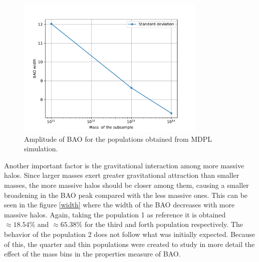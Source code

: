 \begin{figure}[htbp]
       \centering

    \includegraphics[width=90mm]{Images/chapter4/Width_vs_Mh.pdf}
\caption{\small Amplitude of BAO for the populations obtained from MDPL simulation.}
       \label{ampl}
 \end{figure}

Another important factor is the gravitational interaction among more massive halos.
Since larger masses exert greater gravitational attraction than smaller masses, 
the more massive halos should be closer among them, causing a smaller broadening
in the BAO peak compared with the less massive ones. This can be seen in the
figure \ref{width} where the width of the BAO decreases with more massive halos.
Again, taking the population 1 as reference it is obtained $\approx 18.54\%$ and
$\approx 65.38\%$ for the third and forth population respectively. The behavior of
the population $2$ does not follow what was initially expected. Because of this,
the quarter and thin populations were created to study in more detail the effect of
the mass bins in the properties measure of BAO. 



	

